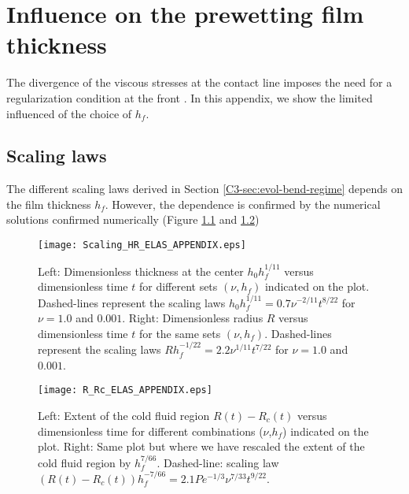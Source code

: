 \chapter{Influence on the prewetting film thickness}
\label{chap:A2}

The divergence of the viscous stresses at the contact line imposes the
need    for    a    regularization     condition    at    the    front
\citep{Lister:2013ia,Flitton:1999iv,Anonymous:QWXp_4JV}.     In   this
appendix, we show the limited influenced of the choice of $h_f$.

\section{Scaling laws}

The     different     scaling      laws     derived     in     Section
\ref{C3-sec:evol-bend-regime}   depends   on    the   film   thickness
$h_f$. However, the dependence is confirmed by the numerical solutions
confirmed  numerically  (Figure \ref{C3-Scaling_HR_ELAS_APPENDIX}  and
\ref{C3-R_Rc_ELAS_APPENDIX})

\begin{figure}[h!]

  \begin{center}
    \graphicspath{ {/Users/thorey/Documents/These/Projet/Refroidissement/Skin_Model/Figure/JFM_V13/} }
    \texttt{[image: Scaling\_HR\_ELAS\_APPENDIX.eps]}
    \caption{Left:    Dimensionless    thickness   at    the    center
      $h_0h_f^{1/11}$ versus dimensionless time $t$ for different sets
      $(\nu,h_f)$ indicated  on the plot.  Dashed-lines  represent the
      scaling   laws   $h_0h_f^{1/11}=   0.7\nu^{-2/11}t^{8/22}$   for
      $\nu = 1.0$ and $0.001$.  Right: Dimensionless radius $R$ versus
      dimensionless   time  $t$   for  the   same  sets   $(\nu,h_f)$.
      Dashed-lines       represent        the       scaling       laws
      $Rh_f^{-1/22}=  2.2\nu^{1/11}t^{7/22}$  for   $\nu  =  1.0$  and
      $0.001$.}
    \label{C3-Scaling_HR_ELAS_APPENDIX}
  \end{center}
\end{figure}
\begin{figure}[h!]
  \begin{center}
    \graphicspath{ {/Users/thorey/Documents/These/Projet/Refroidissement/Skin_Model/Figure/JFM_V13/} }
    \texttt{[image: R\_Rc\_ELAS\_APPENDIX.eps]}
    \caption{Left:  Extent  of  the cold  fluid  region  $R(t)-R_c(t)$
      versus   dimensionless    time   for    different   combinations
      ($\nu$,$h_f$) indicated on the plot.  Right: Same plot but where
      we  have  rescaled  the  extent  of the  cold  fluid  region  by
      $h_f^{7/66}$.          Dashed-line:          scaling         law
      $(R(t)-R_c(t))h_f^{-7/66}= 2.1 Pe^{-1/3}\nu^{7/33}t^{9/22}$.}
    \label{C3-R_Rc_ELAS_APPENDIX}
  \end{center}
\end{figure}

